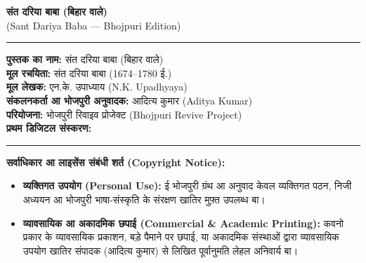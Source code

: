 \documentclass[12pt,a4paper,oneside]{article}
\begin{document}
\newpage
\thispagestyle{empty}

\vfill
\begin{center}
  {\Large \bfseries \color{bordercolor} संत दरिया बाबा (बिहार वाले)} \\[0.3em]
  {\small \color{bordercolor} {\engfont (Sant Dariya Baba --- Bhojpuri Edition)}} \\[1.5em]
  {\color{bordercolor}\rule{0.4\textwidth}{0.8pt}}
\end{center}

\vspace*{1.2cm}

\begin{center}
\begin{minipage}{0.88\textwidth}
  \small
  \setlength{\parskip}{0.7em}

  {\bfseries पुस्तक का नाम:} संत दरिया बाबा (बिहार वाले) \\
  {\bfseries मूल रचयिता:} संत दरिया बाबा (1674--1780 ई.) \\
  {\bfseries मूल लेखक:} एन.के. उपाध्याय {\engfont (N.K. Upadhyaya)} \\
  {\bfseries संकलनकर्ता आ भोजपुरी अनुवादक:} आदित्य कुमार {\engfont (Aditya Kumar)} \\
  {\bfseries परियोजना:} भोजपुरी रिवाइव प्रोजेक्ट {\engfont (Bhojpuri Revive Project)} \\
  {\bfseries प्रथम डिजिटल संस्करण:} {}

  \vspace*{1.0em}
  {\color{bordercolor}\rule{\textwidth}{0.4pt}}
  \vspace*{1.0em}

  {\bfseries सर्वाधिकार आ लाइसेंस संबंधी शर्त {\engfont (Copyright Notice)}:}

  \begin{itemize}\setlength{\itemsep}{0.4em}
    \item {\bfseries व्यक्तिगत उपयोग {\engfont (Personal Use)}:} ई भोजपुरी ग्रंथ आ अनुवाद केवल व्यक्तिगत पठन, निजी अध्ययन आ भोजपुरी भाषा-संस्कृति के संरक्षण खातिर मुफ़्त उपलब्ध बा।
    \item {\bfseries व्यावसायिक आ अकादमिक छपाई {\engfont (Commercial \& Academic Printing)}:} कवनो प्रकार के व्यावसायिक प्रकाशन, बड़े पैमाने पर छपाई, या अकादमिक संस्थाओं द्वारा व्यावसायिक उपयोग खातिर संपादक (आदित्य कुमार) से लिखित पूर्वानुमति लेहल अनिवार्य बा।
  \end{itemize}


\end{minipage}
\end{center}
\end{document}
